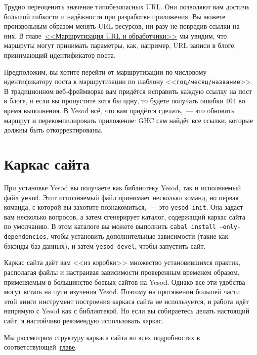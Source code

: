 Трудно переоценить значение типобезопасных URL. Они позволяют вам достичь большой гибкости
и надёжности при разработке приложения. Вы можете произвольным образом менять URL
ресурсов, ни разу не повредив ссылки на них. В главе~\hyperref[chap:routing]{<<Маршрутизация
  URL и обработчики>>} мы увидим, что маршруты могут принимать параметры, как, например,
URL записи в блоге, принимающий идентификатор поста.

Предположим, вы хотите перейти от маршрутизации по числовому идентификатору поста к
маршрутизации по шаблону <<\texttt{год/месяц/название}>>. В традиционном веб-фреймворке
вам придётся исправить каждую ссылку на пост в блоге, и если вы пропустите хотя бы одну,
то будете получать ошибки 404 во время выполнения. В Yesod всё, что вам придётся сделать,~---
это обновить маршрут и перекомпилировать приложение: GHC сам найдёт все ссылки,
которые должны быть откорректированы.

\section{Каркас сайта}

При установке Yesod вы получаете как библиотеку Yesod, так и исполняемый файл
\texttt{yesod}. Этот исполняемый файл принимает несколько команд, но первая команда, с
которой вы захотите познакомиться,~--- это \texttt{yesod init}. Она задаст вам
несколько вопросов, а затем сгенерирует каталог, содержащий каркас сайта по умолчанию. В
этом каталоге вы можете выполнить \texttt{cabal install --only-dependencies}, чтобы
установить дополнительные зависимости (такие как бэкэнды баз данных), и затем
\texttt{yesod devel}, чтобы запустить сайт.

Каркас сайта даёт вам <<из коробки>> множество установившихся практик, располагая файлы и
настраивая зависимости проверенным временем образом, применяемым в большинстве боевых
сайтов на Yesod. Однако все эти удобства могут встать на пути изучения Yesod. Поэтому на
протяжении большей части этой книги инструмент построения каркаса сайта не используется, и
работа идёт напрямую с Yesod как с библиотекой. Но если вы собираетесь делать
настоящий сайт, я настойчиво рекомендую использовать каркас.

Мы рассмотрим структуру каркаса сайта во всех подробностях в
соответствующей~\hyperref[chap:scaffolding]{главе}.

